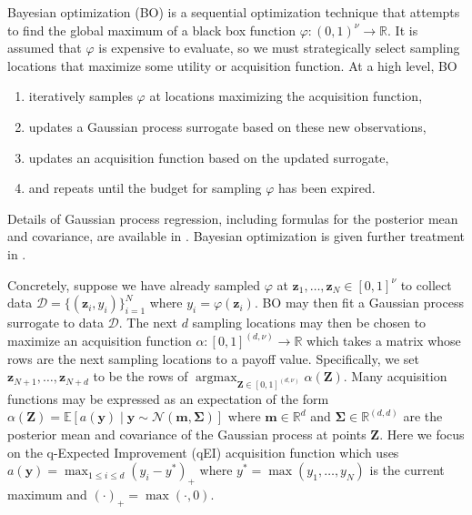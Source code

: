 \documentclass[graybox]{svmult}
\begin{document}
Bayesian optimization (BO) is a sequential optimization technique that attempts to find the global maximum of a black box function $\varphi: (0,1)^{\nu} \to \mathbb{R}$. It is assumed that $\varphi$ is expensive to evaluate, so we must strategically select sampling locations that maximize some utility or acquisition function. At a high level, BO 
\begin{enumerate}
    \item iteratively samples $\varphi$ at locations maximizing the acquisition function,
    \item updates a Gaussian process surrogate based on these new observations,
    \item updates an acquisition function based on the updated surrogate,
    \item and repeats until the budget for sampling $\varphi$ has been expired.
\end{enumerate}
Details of Gaussian process regression, including formulas for the posterior mean and covariance, are available in \cite{rasmussen2006gaussian}. Bayesian optimization is given further treatment in \cite{snoek2012practical}.

Concretely, suppose we have already sampled $\varphi$ at $\boldsymbol{z}_1,\dots,\boldsymbol{z}_{N} \in [0,1]^{\nu}$ to collect data $\mathcal{D}=\{(\boldsymbol{z}_i,y_i)\}_{i=1}^N$ where $y_i = \varphi(\boldsymbol{z}_i)$. BO may then fit a Gaussian process surrogate to data $\mathcal{D}$. The next $d$ sampling locations may then be chosen to maximize an acquisition function $\alpha: [0,1]^{(d,\nu)} \to \mathbb{R}$ which takes a matrix whose rows are the next sampling locations to a payoff value. Specifically, we set $\boldsymbol{z}_{N+1}, \dots, \boldsymbol{z}_{N+d}$ to be the rows of $\mathop{\text{argmax}}_{\boldsymbol{Z} \in [0,1]^{(d,\nu)}}\alpha(\boldsymbol{Z})$. Many acquisition functions may be expressed as an expectation of the form $\alpha(\boldsymbol{Z}) = \mathbb{E}\left[a(\boldsymbol{y}) \mid \boldsymbol{y} \sim \mathcal{N}\left(\boldsymbol{m},\boldsymbol{\Sigma}\right)\right]$ where $\boldsymbol{m} \in \mathbb{R}^{d}$ and  $\boldsymbol{\Sigma} \in \mathbb{R}^{(d,d)}$ are the posterior mean and covariance of the Gaussian process at points $\boldsymbol{Z}$. Here we focus on the q-Expected Improvement (qEI) acquisition function which uses $a(\boldsymbol{y}) = \max_{1 \leq i \leq d} (y_i - y^*)_+$ where $y^*= \max\left(y_1,\dots,y_N\right)$ is the current maximum and $(\cdot)_+ = \max(\cdot,0)$. 
\end{document}
